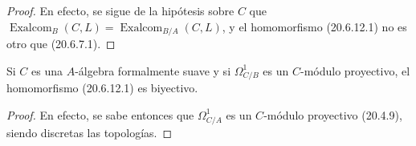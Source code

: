 \begin{proof}
En efecto, se sigue de la hipótesis sobre $C$ que
$\operatorname{Exalcom}_B(C,L)=\operatorname{Exalcom}_{B/A}(C,L)$, y
el homomorfismo (20.6.12.1) no es otro que (20.6.7.1).
\end{proof}

\begin{corollary}[20.6.13]
\label{0.20.6.13-fr}
Si $C$ es una $A$-álgebra formalmente suave y si $\Omega^1_{C/B}$ es
un $C$-módulo proyectivo, el homomorfismo \textup{(20.6.12.1)} es biyectivo.
\end{corollary}

\begin{proof}
En efecto, se sabe entonces que $\Omega^1_{C/A}$ es un $C$-módulo proyectivo
(20.4.9), siendo discretas las topologías.
\end{proof}

